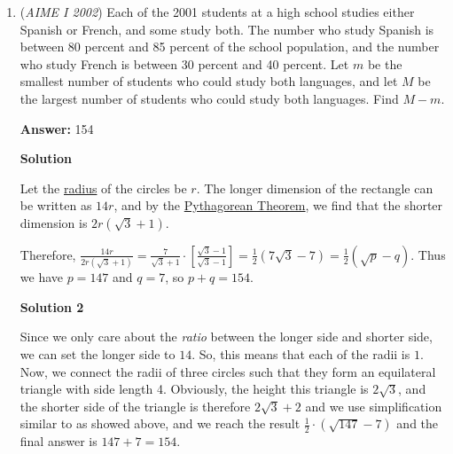 \begin{enumerate}
 
Since the total space of possibilities is $10^3\cdot 26^3$, we see that the probability is $\frac{26^2\cdot 10^3+10^2(26^3-26^2)}{10^3\cdot 26^3}=\frac{676000+1690000}{17576000}=\frac{2366000}{17576000}=\frac{7}{52}$. Therefore the answer is $7+52=\boxed{059}$.

 Note: the problem linked here is covered 0:15-1:15

 


	\item (\textit{AIME I 2002}) Each of the 2001 students at a high school studies either Spanish or French, and some study both. The number who study Spanish is between 80 percent and 85 percent of the school population, and the number who study French is between 30 percent and 40 percent. Let $m$ be the smallest number of students who could study both languages, and let $M$ be the largest number of students who could study both languages. Find $M-m$. 


 
 \textbf{Answer: }154



\textbf{Solution}

Let the \href{https://artofproblemsolving.com/wiki/index.php?title=Radius}{radius} of the circles be $r$. The longer dimension of the rectangle can be written as $14r$, and by the \href{https://artofproblemsolving.com/wiki/index.php?title=Pythagorean\_Theorem}{Pythagorean Theorem}, we find that the shorter dimension is $2r\left(\sqrt{3}+1\right)$.

 Therefore, $\frac{14r}{2r\left(\sqrt{3}+1\right)}= \frac{7}{\sqrt{3} + 1} \cdot \left[\frac{\sqrt{3}-1}{\sqrt{3}-1}\right] = \frac{1}{2}\left(7\sqrt{3} - 7\right) = \frac{1}{2}\left(\sqrt{p}-q\right)$. Thus we have $p=147$ and $q=7$, so $p+q=\boxed{154}$.

 



\textbf{Solution 2}

Since we only care about the \textit{ratio} between the longer side and shorter side, we can set the longer side to $14$. So, this means that each of the radii is $1$. Now, we connect the radii of three circles such that they form an equilateral triangle with side length 4. Obviously, the height this triangle is $2\sqrt{3}$, and the shorter side of the triangle is therefore $2\sqrt{3}+2$ and we use simplification similar to as showed above, and we reach the result $\frac{1}{2} \cdot (\sqrt{147}-7)$ and the final answer is $147+7 = \boxed{154}$.


\end{enumerate}
